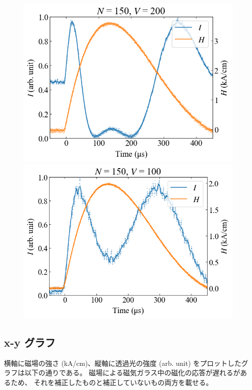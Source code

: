 \documentclass[9pt,dvipdfmx,a4paper]{jsarticle}
\begin{document}
\begin{figure}[H]
\begin{minipage}[t]{0.24\columnwidth}
        \includegraphics[width = \columnwidth]{xt/24.png}
    \end{minipage}
    \hfill
    \begin{minipage}[t]{0.24\columnwidth}
        \centering
        \includegraphics[width = \columnwidth]{xt/25.png}
    \end{minipage}
\end{figure}

\subsection{x-y グラフ}

横軸に磁場の強さ (kA/cm)、縦軸に透過光の強度 (arb. unit) をプロットしたグラフは以下の通りである。
磁場による磁気ガラス中の磁化の応答が遅れるがあるため、
それを補正したものと補正していないもの両方を載せる。
\end{document}
